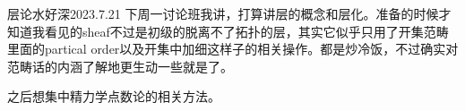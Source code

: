 \begin{diary}{层论水好深}{2023.7.21}
    下周一讨论班我讲，打算讲层的概念和层化。准备的时候才知道我看见的sheaf不过是初级的脱离不了拓扑的层，其实它似乎只用了开集范畴里面的partical order以及开集中加细这样子的相关操作。都是炒冷饭，不过确实对范畴话的内涵了解地更生动一些就是了。

    之后想集中精力学点数论的相关方法。
\end{diary}